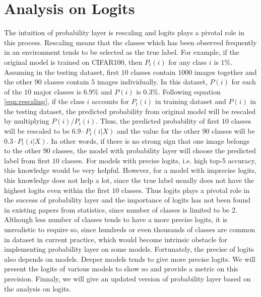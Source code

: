 \documentclass{article}
\begin{document}
\section{Analysis on Logits}
The intuition of probability layer is rescaling and logits plays a pivotal role in this process. Rescaling means that the classes which has been observed frequently in an environment tends to be selected as the true label. For example, if the original model is trained on CIFAR100, then $P_t(i)$ for any class $i$ is $1\%$. Assuming in the testing dataset, first $10$ classes contain $1000$ images together and the other $90$ classes contain $5$ images individually. In this dataset, $P(i)$ for each of the $10$ major classes is $6.9$\% and $P(i)$ is $0.3$\%. Following equation \eqref{eqn:rescaling}, if the class $i$ accounts for $P_t(i)$ in training dataset and $P(i)$ in the testing dataset, the predicted probability from original model will be rescaled by multiplying $P(i)/P_t(i)$. Thus, the predicted probability of first $10$ classes will be rescaled to be $6.9 \cdot P_t(i|X)$ and the value for the other $90$ classes will be $0.3 \cdot P_t(i|X)$. In other words, if there is no strong sign that one image belongs to the other $90$ classes, the model with probability layer will choose the predicted label from first $10$ classes. For models with precise logits, i.e. high top-5 accuracy, this knowledge would be very helpful. However, for a model with imprecise logits, this knowledge does not help a lot, since the true label usually does not have the highest logits even within the first $10$ classes. Thus logits plays a pivotal role in the success of probability layer and the importance of logits has not been found in existing papers \cite{saerens2002adjusting} from statistics, since number of classes is limited to be $2$. Although less number of classes tends to have a more precise logits, it is unrealistic to require so, since hundreds or even thousands of classes are common in dataset in current practice, which would become intrinsic obstacle for implementing probability layer on some models. Fortunately, the precise of logits also depends on models. Deeper models tends to give more precise logits. We will present the logits of various models to show so and provide a metric on this precision. Finnaly, we will give an updated version of probability layer based on the analysis on logits.
\end{document}
